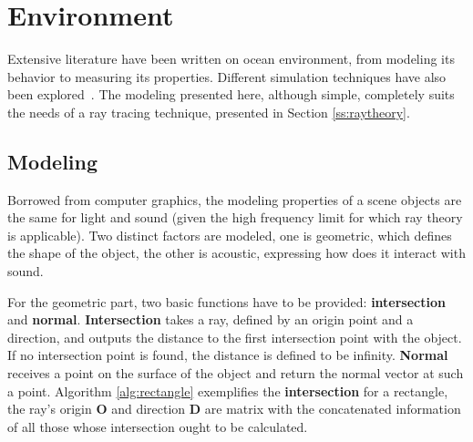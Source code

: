 \section{Environment}

Extensive literature have been written on ocean environment, from modeling its
behavior to measuring its properties. Different simulation techniques have also
been explored~\cite{Etter2013}. The modeling presented here, although simple,
completely suits the needs of a ray tracing technique, presented in Section
\ref{ss:raytheory}.

\subsection{Modeling}
\label{ss:modeling}
Borrowed from computer graphics, the modeling properties of a scene objects
are the same for light and sound (given the high frequency limit for which ray
theory is applicable). Two distinct factors are modeled, one is geometric,
which defines the shape of the object, the other is acoustic, expressing how
does it interact with sound.

For the geometric part, two basic functions have to be provided: \textbf{intersection}
and \textbf{normal}. \textbf{Intersection} takes a ray, defined by an origin
point and a direction, and outputs the distance to the first intersection point with the
object. If no intersection point is found, the distance is defined to be
infinity. \textbf{Normal} receives a point on the surface of the object and
return the normal vector at such a point. Algorithm \ref{alg:rectangle}
exemplifies the \textbf{intersection} for a rectangle, the ray's origin
$\mathbf{O}$ and direction $\mathbf{D}$ are matrix with the concatenated
information of all those whose intersection ought to be calculated.

